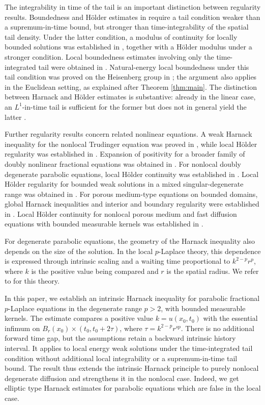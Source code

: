 \documentclass[10pt]{amsart}
\theoremstyle{plain}
\theoremstyle{definition}
\theoremstyle{remark}
\numberwithin{equation}{section}
\begin{document}
The integrability in time of the tail is an important distinction
between regularity results. Boundedness and H\"older estimates in
\cite{ByunKim} require a tail condition weaker than a
supremum-in-time bound, but stronger than time-integrability of the
spatial tail density. Under the latter condition, a modulus of
continuity for locally bounded solutions was established in
\cite{LiaoModulus}, together with a H\"older modulus under a stronger
condition. Local boundedness estimates involving only the
time-integrated tail were obtained in \cite{KumagaiWangZhang}.
Natural-energy local boundedness under this tail condition was
proved on the Heisenberg group in \cite{KarTewary}; the argument
also applies in the Euclidean setting, as explained after
Theorem \ref{thm:main}. The distinction between Harnack and H\"older
estimates is substantive: already in the linear case, an
$L^1$-in-time tail is sufficient for the former but does not in
general yield the latter \cite{KassmannWeidner}.

Further regularity results concern related nonlinear equations.
A weak Harnack inequality for the nonlocal Trudinger equation was
proved in \cite{PrasadWeakHarnack}, while local H\"older regularity was established in
\cite{AdimurthiTrudinger}. Expansion of positivity for a broader
family of doubly nonlinear fractional equations was obtained in
\cite{MisawaYamaura}. For nonlocal doubly degenerate parabolic
equations, local H\"older continuity
was established in \cite{LiDoublyDegenerate}. Local H\"older
regularity for bounded weak solutions in a mixed singular-degenerate
range was obtained in \cite{AdimurthiModasiya}.
For porous medium-type equations
on bounded domains, global Harnack inequalities and interior and
boundary regularity were established in \cite{BonforteFigalliVazquez}.
Local H\"older continuity for nonlocal porous medium and fast diffusion equations with bounded measurable kernels was established in
\cite{KimLeePrasad}. 

For degenerate parabolic equations, the geometry of the Harnack
inequality also depends on the size of the solution. In the local
$p$-Laplace theory, this dependence is expressed through intrinsic
scaling and a waiting time proportional to $k^{2-p}r^p$, where $k$
is the positive value being compared and $r$ is the spatial radius.
We refer to \cite{DiBenedetto,DGV} for this theory.


In this paper, we establish an intrinsic Harnack inequality for
parabolic fractional $p$-Laplace equations in the degenerate range
$p>2$, with bounded measurable kernels. The estimate compares a
positive value $k=u(x_0,t_0)$ with the essential infimum on
$B_r(x_0)\times(t_0,t_0+2\tau)$, where $\tau=k^{2-p}r^{sp}$.
There is no additional forward time gap, but the assumptions retain
a backward intrinsic history interval.
It applies to local energy weak solutions under the time-integrated
tail condition without additional
local integrability or a supremum-in-time tail bound. The result thus
extends the intrinsic Harnack principle
\cite{DGVActa,DGVDuke} to purely nonlocal degenerate diffusion
and strengthens it in the nonlocal case. Indeed, we get elliptic type 
Harnack estimates for parabolic equations which are false in the local case. 
\end{document}
